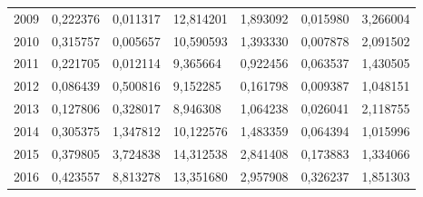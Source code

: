 \begin{table}
\begin{tabular}{p{1cm}p{2cm}p{2cm}p{2cm}p{2cm}p{2cm}p{2cm}}
 2009 &              0,222376 &                               0,011317 &                                   12,814201 &                            1,893092 &                       0,015980 &                    3,266004 \\
 2010 &              0,315757 &                               0,005657 &                                   10,590593 &                            1,393330 &                       0,007878 &                    2,091502 \\
 2011 &              0,221705 &                               0,012114 &                                    9,365664 &                            0,922456 &                       0,063537 &                    1,430505 \\
 2012 &              0,086439 &                               0,500816 &                                    9,152285 &                            0,161798 &                       0,009387 &                    1,048151 \\
 2013 &              0,127806 &                               0,328017 &                                    8,946308 &                            1,064238 &                       0,026041 &                    2,118755 \\
 2014 &              0,305375 &                               1,347812 &                                   10,122576 &                            1,483359 &                       0,064394 &                    1,015996 \\
 2015 &              0,379805 &                               3,724838 &                                   14,312538 &                            2,841408 &                       0,173883 &                    1,334066 \\
 2016 &              0,423557 &                               8,813278 &                                   13,351680 &                            2,957908 &                       0,326237 &                    1,851303 \\
\bottomrule
\end{tabular}
\end{table}
